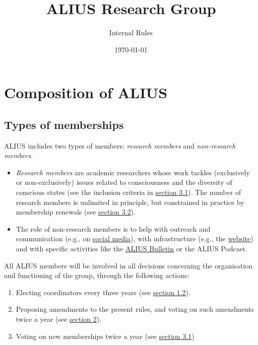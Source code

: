 \documentclass[a4paper, 11pt]{scrartcl}
\begin{document}
\title{\vspace{-2cm} \LARGE ALIUS Research Group}
\subtitle{\Large Internal Rules}
\author{}
\date{\large \today}
\maketitle

\section{Composition of ALIUS}
\subsection{Types of memberships}

ALIUS includes two types of members: \emph{research members} and \emph{non-research members}.

\begin{itemize}

\item \emph{Research members} are academic researchers whose work tackles (exclusively or non-exclusively) issues related to consciousness and the diversity of conscious states (see the inclusion criteria in \hyperref[new_memberships]{section 3.1}). The number of research members is unlimited in principle, but constrained in practice by membership renewals (see \hyperref[membership_renewal]{section 3.2}). 

\item The role of non-research members is to help with outreach and communication (e.g., on \href{https://www.facebook.com/aliusresearch/}{social media}), with infrastructure (e.g., the \href{https://www.aliusresearch.org/}{website}) and with specific activities like the \href{https://www.aliusresearch.org/bulletin.html}{ALIUS Bulletin} or the ALIUS Podcast.


\end{itemize}

\noindent All ALIUS members will be involved in all decisions concerning the organisation and functioning of the group, through the following actions:

\begin{enumerate}
\item Electing coordinators every three years (see \hyperref[coordinators]{section 1.2}).
\item Proposing amendments to the present rules, and voting on such amendments twice a year (see \hyperref[modif]{section 2}).
\item Voting on new memberships twice a year (see \hyperref[new_memberships]{section 3.1})

\end{enumerate}
\end{document}
